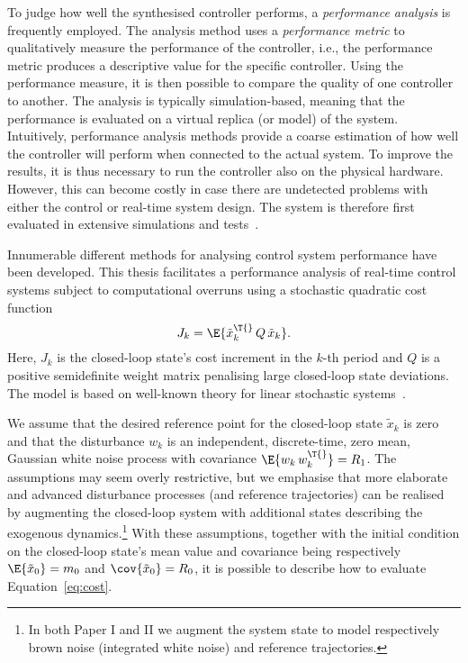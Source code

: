 To judge how well the synthesised controller performs, a \emph{performance analysis} is frequently employed.
The analysis method uses a \emph{performance metric} to qualitatively measure the performance of the controller, i.e., the performance metric produces a descriptive value for the specific controller.
Using the performance measure, it is then possible to compare the quality of one controller to another.
The analysis is typically simulation-based, meaning that the performance is evaluated on a virtual replica (or model) of the system.
Intuitively, performance analysis methods provide a coarse estimation of how well the controller will perform when connected to the actual system.
To improve the results, it is thus necessary to run the controller also on the physical hardware.
However, this can become costly in case there are undetected problems with either the control or real-time system design.
The system is therefore first evaluated in extensive simulations and tests~\cite{Mandrioli:2022}.

Innumerable different methods for analysing control system performance have been developed.
This thesis facilitates a performance analysis of real-time control systems subject to computational overruns using a stochastic quadratic cost function
%
\begin{equation}%
    \label{eq:cost}%
    J_k = \E{\tilde{x}_k^\T{}\, Q\, \tilde{x}_k}.
\end{equation}
%
Here, $J_k$ is the closed-loop state's cost increment in the $k$-th period and $Q$ is a positive semidefinite weight matrix penalising large closed-loop state deviations.
The model is based on well-known theory for linear stochastic systems~\cite{Astrom:1970, Astrom:1997, Cervin:2019}.

We assume that the desired reference point for the closed-loop state $\tilde{x}_k$ is zero and that the disturbance $w_k$ is an independent, discrete-time, zero mean, Gaussian white noise process with covariance $\E{w_k\,w_k^\T{}} = R_1$.
The assumptions may seem overly restrictive, but we emphasise that more elaborate and advanced disturbance processes (and reference trajectories) can be realised by augmenting the closed-loop system with additional states describing the exogenous dynamics.\footnote{In both Paper I and II we augment the system state to model respectively brown noise (integrated white noise) and reference trajectories.}
With these assumptions, together with the initial condition on the closed-loop state's mean value and covariance being respectively $\E{\tilde{x}_0} = m_0$ and $\cov{\tilde{x}_0} = R_0$, it is possible to describe how to evaluate Equation~\eqref{eq:cost}.

